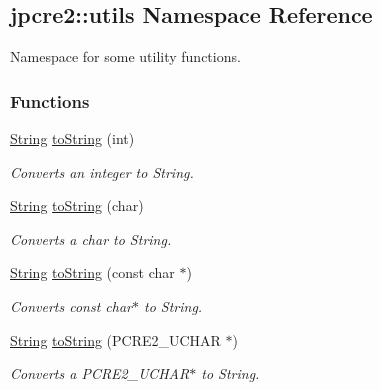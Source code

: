 \hypertarget{namespacejpcre2_1_1utils}{}\subsection{jpcre2\+:\+:utils Namespace Reference}
\label{namespacejpcre2_1_1utils}


Namespace for some utility functions.  


\subsubsection*{Functions}
\begin{DoxyCompactItemize}
\item 
\hyperlink{namespacejpcre2_a91f03070152fb228bc116c5a737f1d16}{String} \hyperlink{namespacejpcre2_1_1utils_a3603a3493202e7408e18fd0a912bf725_a3603a3493202e7408e18fd0a912bf725}{to\+String} (int)
\begin{DoxyCompactList}\small\item\em Converts an integer to String. \end{DoxyCompactList}\item 
\hyperlink{namespacejpcre2_a91f03070152fb228bc116c5a737f1d16}{String} \hyperlink{namespacejpcre2_1_1utils_a917512161b56047d6ef240bdba2ac212_a917512161b56047d6ef240bdba2ac212}{to\+String} (char)
\begin{DoxyCompactList}\small\item\em Converts a char to String. \end{DoxyCompactList}\item 
\hyperlink{namespacejpcre2_a91f03070152fb228bc116c5a737f1d16}{String} \hyperlink{namespacejpcre2_1_1utils_a4065a2a40144999cd2a94e7a7e1d5eb6_a4065a2a40144999cd2a94e7a7e1d5eb6}{to\+String} (const char $\ast$)
\begin{DoxyCompactList}\small\item\em Converts const char$\ast$ to String. \end{DoxyCompactList}\item 
\hyperlink{namespacejpcre2_a91f03070152fb228bc116c5a737f1d16}{String} \hyperlink{namespacejpcre2_1_1utils_aea66a35f467adf41730c5a3bb21be6ed_aea66a35f467adf41730c5a3bb21be6ed}{to\+String} (P\+C\+R\+E2\+\_\+\+U\+C\+H\+AR $\ast$)
\begin{DoxyCompactList}\small\item\em Converts a P\+C\+R\+E2\+\_\+\+U\+C\+H\+A\+R$\ast$ to String. \end{DoxyCompactList}\item 

\end{DoxyCompactItemize}
